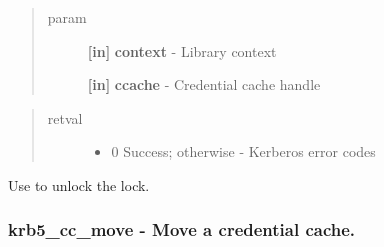 \documentclass[letterpaper,10pt,english]{sphinxmanual}
\begin{document}
\begin{fulllineitems}
\label{appdev/refs/api/krb5_cc_lock:krb5_cc_lock}
\end{fulllineitems}

\begin{quote}\begin{description}
\item[{param}] \leavevmode
\textbf{{[}in{]}} \textbf{context} - Library context

\textbf{{[}in{]}} \textbf{ccache} - Credential cache handle

\end{description}\end{quote}
\begin{quote}\begin{description}
\item[{retval}] \leavevmode\begin{itemize}
\item {} 
0   Success; otherwise - Kerberos error codes

\end{itemize}

\end{description}\end{quote}

Use {\hyperref[appdev/refs/api/krb5_cc_unlock:krb5_cc_unlock]{}} to unlock the lock.


\subsubsection{krb5\_cc\_move -  Move a credential cache.}
\label{appdev/refs/api/krb5_cc_move:krb5-cc-move-move-a-credential-cache}\label{appdev/refs/api/krb5_cc_move::doc}

\begin{fulllineitems}
\label{appdev/refs/api/krb5_cc_move:krb5_cc_move}
\end{fulllineitems}
\end{document}
